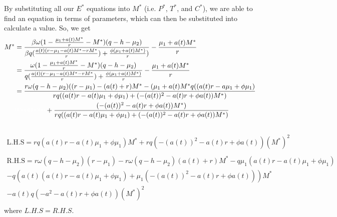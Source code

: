 \documentclass[12pt]{article}
\begin{document}
    By substituting all our $E^{*}$ equations into $M^{*}$ (i.e. $P^{*}$, $T^{*}$, and $C^{*}$), we are able to find an equation in terms of parameters, which can then be substituted into calculate a value. So, we get
    \begin{align*}
        M^{*} &= \frac{\beta \omega(1-\frac{\mu_{1} + a(t)M^{*}}{r}-M^{*})(q - h - \mu_{2})}{\beta q (\frac{a(t)(r-\mu_{1}-a(t)M^{*}-rM^{*}}{r}) + \frac{\phi(\mu_{1} + a(t)M^{*})}{r})} - \frac{\mu_{1} + a(t)M^{*}}{r} \\
        &= \frac{\omega(1-\frac{\mu_{1} + a(t)M^{*}}{r}-M^{*})(q - h - \mu_{2})}{q (\frac{a(t)(r-\mu_{1}-a(t)M^{*}-rM^{*}}{r}) + \frac{\phi(\mu_{1} + a(t)M^{*})}{r}} - \frac{\mu_{1} + a(t)M^{*}}{r} \\
        &= \frac{r\omega (q-h-\mu_{2})((r-\mu_{1})-(a(t) + r)M^{*} - (\mu_{1} + a(t)M^{*}q((a(t)r - a \mu_{1} + \phi \mu_{1})}{rq((a(t)r - a(t) \mu_{1} + \phi \mu_{1}) + (-(a(t))^{2} - a(t)r + \phi a(t))M^{*})} \\
        & \textcolor{white}{000000000} + \frac{(-(a(t))^{2} - a(t)r + \phi a(t))M^{*})}{rq((a(t)r - a(t) \mu_{1} + \phi \mu_{1}) + (-(a(t))^{2} - a(t)r + \phi a(t))M^{*})}
    \end{align*}
    \\
    \begin{multline*}
        \text{L.H.S} = 
        rq(a(t)r-a(t)\mu_{1} + \phi \mu_{1})M^{*} + rq(-(a(t))^{2} - a(t)r + \phi a(t))(M^{*})^{2} \\
    \end{multline*}
    \begin{multline*}
        \text{R.H.S} = r \omega (q - h - \mu_{2})(r - \mu_{1}) - r \omega(q-h-\mu_{2})(a(t)+r)M^{*} - q \mu_{1}(a(t)r-a(t) \mu_{1} + \phi \mu_{1})\\ - q(a(t)(a(t)r-a(t) \mu_{1} + \phi \mu_{1}) + \mu_{1}(-(a(t))^{2}-a(t)r+\phi a(t)))M^{*}\\ - a(t)q(-a^{2}-a(t)r+ \phi a(t))(M^{*})^{2} \\ 
    \end{multline*}
    where $L.H.S = R.H.S$.\\ \\
    
\end{document}
